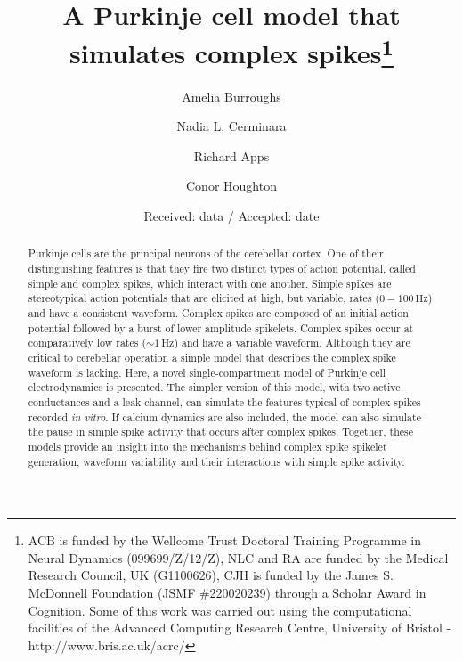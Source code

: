 \documentclass[twocolumn]{svjour3}          %
\newcommand{\hz}{\,\mathrm{Hz}}
\begin{document}
\title{A Purkinje cell model that simulates complex spikes\thanks{ACB
    is funded by the Wellcome Trust Doctoral Training Programme in
    Neural Dynamics (099699/Z/12/Z), NLC and RA are funded by the
    Medical Research Council, UK (G1100626), CJH is funded by the
    James S. McDonnell Foundation (JSMF \#220020239) through a Scholar
    Award in Cognition. Some of this work was carried out using the
    computational facilities of the Advanced Computing Research
    Centre, University of Bristol - http://www.bris.ac.uk/acrc/}}

\author{Amelia Burroughs \and Nadia L. Cerminara \and Richard Apps \and Conor Houghton}


\date{Received: data / Accepted: date}

\maketitle


\begin{abstract}

Purkinje cells are the principal neurons of the cerebellar cortex. One
of their distinguishing features is that they fire two distinct types
of action potential, called simple and complex spikes, which interact
with one another. Simple spikes are stereotypical action potentials
that are elicited at high, but variable, rates ($0-100\hz$) and have a
consistent waveform. Complex spikes are composed of an initial action
potential followed by a burst of lower amplitude spikelets. Complex
spikes occur at comparatively low rates ($\sim 1\hz$) and have a
variable waveform. Although they are critical to cerebellar operation
a simple model that describes the complex spike waveform is
lacking. Here, a novel single-compartment model of Purkinje cell
electrodynamics is presented. The simpler version of this model, with
two active conductances and a leak channel, can simulate the features
typical of complex spikes recorded \textit{in vitro}. If calcium
dynamics are also included, the model can also simulate the pause in
simple spike activity that occurs after complex spikes. Together,
these models provide an insight into the mechanisms behind complex
spike spikelet generation, waveform variability and their interactions
with simple spike activity.   \PACS{}

\end{abstract}
\end{document}
